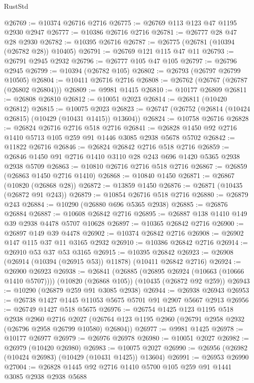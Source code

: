 \begin{lexlean}{RustStd}
\begin{coremodule}
@26769 := @10374 @26716 @2716
@26775 := @26769 @113 @123 @47 @1195 @2930 @2947
@26777 := @10386 @26716 @2716
@26781 := @26777 @28 @47 @28 @2930
@26782 := @10395 @26716
@26787 := @26775 (@26781 (@10394 (@26782 @28)) @10405)
@26791 := @26769 @121 @115 @47 @11
@26793 := @26791 @2945 @2932
@26796 := @26777 @105 @47 @105
@26797 := @26796 @2945
@26799 := @10394 (@26782 @105)
@26802 := @26793 (@26797 @26799 @10505)
@26804 := @10411 @26716 @2716
@26808 := @26762 (@26767 (@26787 (@26802 @26804)))
@26809 := @9981 @1415
@26810 := @10177 @26809
@26811 := @26808 @26810
@26812 := @10051 @2023
@26814 := @26811 (@10420 @26812)
@26815 := @10075 @2023
@26823 := @26747 (@26752 (@26814 (@10424 @26815) (@10429 (@10431 @1415)) @13604))
@26824 := @10758 @26716
@26828 := @26824 @26716 @2716 @518 @2716
@26841 := @26828 @1450 @92 @2716 @1410 @5713 @105 @259 @91 @1446 @3085 @2938 @5678 @5702
@26842 := @11822 @26716
@26846 := @26824 @26842 @2716 @518 @2716
@26859 := @26846 @1450 @91 @2716 @1410 @3110 @28 @243 @696 @1420 @5365 @2938 @2938 @5709
@26863 := @10810 @26716 @2716 @518 @2716
@26867 := @26859 (@26863 @1450 @2716 @1410)
@26868 := @10840 @1450
@26871 := @26867 (@10820 (@26868 @28))
@26872 := @13859 @1450
@26876 := @26871 (@10435 (@26872 @91 @243))
@26879 := @10854 @26716 @518 @2716
@26880 := @26879 @243
@26884 := @10290 (@26880 @696 @5365 @2938)
@26885 := @26876 @26884
@26887 := @10608 @26842 @2716
@26895 := @26887 @138 @1410 @149 @39 @2938 @4478 @5707 @10628
@26897 := @10365 @26842 @2716
@26900 := @26897 @149 @39 @4478
@26902 := @10374 @26842 @2716
@26908 := @26902 @147 @115 @37 @11 @3165 @2932
@26910 := @10386 @26842 @2716
@26914 := @26910 @53 @37 @53 @3165
@26915 := @10395 @26842
@26923 := @26908 (@26914 (@10394 (@26915 @53)) @11878) (@10411 @26842 @2716)
@26924 := @26900 @26923
@26938 := @26841
    (@26885 (@26895 @26924 (@10663 (@10666 @1410 @5707))))
    (@10820 (@26868 @105))
    (@10435 (@26872 @92 @259))
@26943 := @10290 (@26879 @259 @91 @3085 @2938)
@26944 := @26938 @26943
@26953 := @26738 @1427 @1445 @11053 @5675 @5701 @91 @2907 @5667 @2913
@26956 := @26749 @1427 @518 @5675
@26976 := @26754
    @1425
    @123
    @1195
    @518
    @2938
    @2960
    @2716
    @2027
    (@26764 @123 @1195 @2960 (@26791 @2958 @2932 (@26796 @2958 @26799 @10580) @26804))
@26977 := @9981 @1425
@26978 := @10177 @26977
@26979 := @26976 @26978
@26980 := @10051 @2027
@26982 := @26979 (@10420 @26980)
@26983 := @10075 @2027
@26990 := @26956 (@26982 (@10424 @26983) (@10429 (@10431 @1425)) @13604)
@26991 := @26953 @26990
@27004 := @26828 @1445 @92 @2716 @1410 @5700 @105 @259 @91 @1441 @3085 @2938 @2938 @5688

\end{coremodule}
\end{lexlean}
